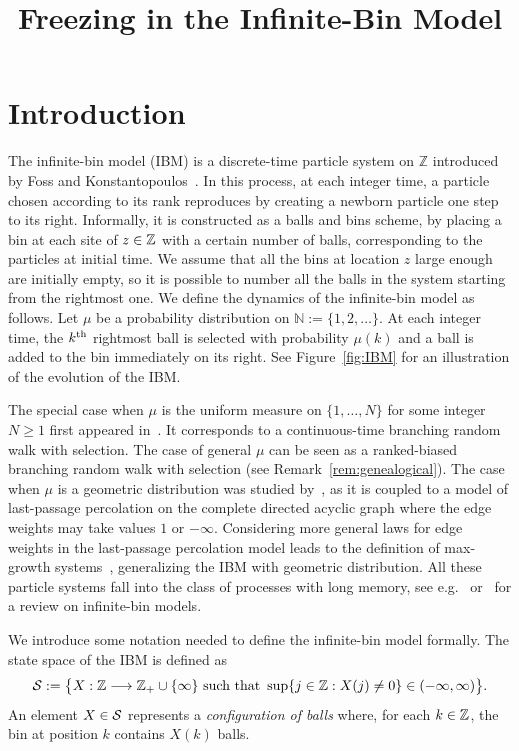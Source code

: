 \documentclass[AHL,Unicode,longabstracts,published]{cedram}
\title{Freezing in the Infinite-Bin Model}
\author[\initial{B.} \lastname{Mallein}]{\firstname{Bastien} \lastname{Mallein}}
\author[\initial{S.} \lastname{Ramassamy}]{\firstname{Sanjay} \lastname{Ramassamy}}
\author[\initial{A.} \lastname{Singh}]{\firstname{Arvind} \lastname{Singh}}
\newcommand{\bbN}{\mathbb{N}}
\newcommand{\Z}{\mathbb{Z}}
\renewcommand{\S}{\mathcal{S}}
\let\oldin\in
\renewcommand{\in}{\mathchoice{\oldin}{\oldin}{\,\oldin\,}{\,\oldin\,}}
\renewcommand*{\to}{\mathchoice{\longrightarrow}{\rightarrow}{\rightarrow}{\rightarrow}}
\newcommand{\Z}{\mathbb{Z}}
\begin{document}
\maketitle

\section{Introduction}\label{sec:introduction}

The infinite-bin model (IBM) is a discrete-time particle system on $\Z$ introduced by Foss and Konstantopoulos~\cite{FK}. In this process, at each integer time, a particle chosen according to its rank reproduces by creating a newborn particle one step to its right. Informally, it is constructed as a balls and bins scheme, by placing a bin at each site of $z\in\Z$ with a certain number of balls, corresponding to the particles at initial time. We assume that all the bins at location $z$ large enough are initially empty, so it is possible to number all the balls in the system starting from the rightmost one. We define the dynamics of the infinite-bin model as follows. Let $\mu$ be a probability distribution on $\bbN
:= \{1,2,\ldots\}$. At each integer time, the $k^{\rm th}$ rightmost ball is selected with probability $\mu(k)$ and a ball is added to the bin immediately on its right. See Figure~\ref{fig:IBM} for an illustration of the evolution of the IBM.


The special case when $\mu$ is the uniform measure on $\{1,\ldots,N\}$ for some integer $N\geq1$ first appeared in~\cite{AP}. It corresponds to a continuous-time branching random walk with selection. The case of general $\mu$ can be seen as a ranked-biased branching random walk with selection (see Remark~\ref{rem:genealogical}). The case when $\mu$ is a geometric distribution was studied by~\cite{FK}, as it is coupled to a model of last-passage percolation on the complete directed acyclic graph where the edge weights may take values $1$ or $-\infty$. Considering more general laws for edge weights in the last-passage percolation model leads to the definition of max-growth systems~\cite{FKMR}, generalizing the IBM with geometric distribution. All these particle systems fall into the class of processes with long memory, see e.g.~\cite{CFF} or~\cite{FoKoMaRa2023} for a review on infinite-bin models.


We introduce some notation needed to define the infinite-bin model formally. The state space of the IBM is defined as
\[
\S
:= \bigl\{ X : \Z \to \Z_+\cup \{\infty\} \text{ such that } \sup\{ j \in \Z : X(j) \neq 0 \} \in (-\infty,\infty) \bigr\}.
\]
An element $X\in \S$ represents a \emph{configuration of balls} where, for each $k \in \Z$, the bin at position $k$ contains $X(k)$ balls.
\end{document}
